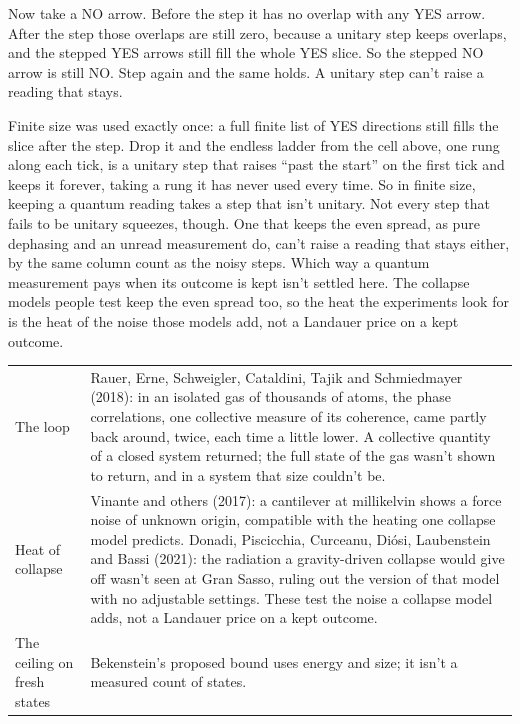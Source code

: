 \documentclass[11pt,twoside]{article}
\theoremstyle{thielethm}
\theoremstyle{thieledef}
\theoremstyle{thieledef}
\theoremstyle{thieledef}
\theoremstyle{thielethm}
\theoremstyle{thieleobs}
\theoremstyle{thielethm}
\begin{document}
Now take a NO arrow. Before the step it has no overlap with any YES arrow. After the step those overlaps are still zero, because a unitary step keeps overlaps, and the stepped YES arrows still fill the whole YES slice. So the stepped NO arrow is still NO. Step again and the same holds. A unitary step can't raise a reading that stays.

Finite size was used exactly once: a full finite list of YES directions still fills the slice after the step. Drop it and the endless ladder from the cell above, one rung along each tick, is a unitary step that raises ``past the start'' on the first tick and keeps it forever, taking a rung it has never used every time. So in finite size, keeping a quantum reading takes a step that isn't unitary. Not every step that fails to be unitary squeezes, though. One that keeps the even spread, as pure dephasing and an unread measurement do, can't raise a reading that stays either, by the same column count as the noisy steps. Which way a quantum measurement pays when its outcome is kept isn't settled here. The collapse models people test keep the even spread too, so the heat the experiments look for is the heat of the noise those models add, not a Landauer price on a kept outcome.

\begingroup\small
\begin{longtable}{p{} p{}}
The loop & Rauer, Erne, Schweigler, Cataldini, Tajik and Schmiedmayer (2018): in an isolated
gas of thousands of atoms, the phase correlations, one collective measure of its coherence, came
partly back around, twice, each time a little lower. A collective quantity of a closed system
returned; the full state of the gas wasn't shown to return, and in a system that size couldn't be. \\[3pt]
Heat of collapse & Vinante and others (2017): a cantilever at millikelvin shows a force noise
of unknown origin, compatible with the heating one collapse model predicts. Donadi,
Piscicchia, Curceanu, Di\'osi, Laubenstein and Bassi (2021): the radiation a gravity-driven
collapse would give off wasn't seen at Gran Sasso, ruling out the version of that model with
no adjustable settings. These test the noise a collapse model adds, not a Landauer price on a
kept outcome. \\[3pt]
The ceiling on fresh states & Bekenstein's proposed bound uses energy and size; it isn't a
measured count of states. \\
\end{longtable}
\endgroup
\end{document}
